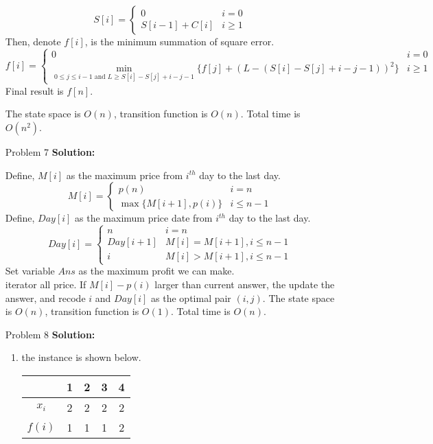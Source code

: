 \normalfont\documentclass[letterpaper,11pt]{article}
\begin{document}
\begin{enumerate}
	$$ S[i]=\left\{
		\begin{array}{ll}
		0   &    i = 0\\
		S[i-1] + C[i] &           i \ge 1
		\end{array} \right. 
	$$
	Then, denote $f[i]$, is the minimum summation of square error.\\
	$$ f[i]=\left\{
		\begin{array}{ll}
		0   &    i = 0\\
		\min \limits_{0 \le j \le i -1\text{ and } L \ge S[i] - S[j] + i - j - 1}\{f[j] + (L - (S[i] - S[j] + i - j - 1))^2\} &           i \ge 1
		\end{array} \right. 
	$$
	Final result is $f[n]$.\par
	The state space is $O(n)$, transition function is $O(n)$. Total time is $O(n^2)$.
\item [Problem 7]\textbf{Solution:}\par
	Define, $M[i]$ as the maximum price from $i^{th}$ day to the last day.
	$$ M[i]=\left\{
		\begin{array}{ll}
		p(n)   &    i = n\\
		\max\{M[i + 1], p(i)\} &           i \le n - 1
		\end{array} \right. 
	$$
	Define, $Day[i]$ as the maximum price date from $i^{th}$ day to the last day.
	$$ Day[i]=\left\{
		\begin{array}{ll}
		n   &    i = n\\
		Day[i + 1]   &    M[i] = M[i+1], i \le n - 1\\
		i & M[i] > M[i+1], i \le n - 1
		\end{array} \right. 
	$$
	Set variable $Ans$ as the maximum profit we can make.\\
	iterator all price. If $M[i] - p(i)$ larger than current answer, the update the answer, and recode $i$ and $Day[i]$ as the optimal pair $(i,j)$.
	The state space is $O(n)$, transition function is $O(1)$. Total time is $O(n)$.
\item [Problem 8]\textbf{Solution:}\par
\begin{enumerate}
	\item the instance is shown below.\par
		\begin{tabular}{|c|c|c|c|c|}
			\hline
			& 1&  2 &  3 &  4   \\
			\hline
			$x_i$ & 2 & 2 & 2 & 2 \\
			\hline
			$f(i)$ & 1 & 1 & 1 & 2 \\

\end{tabular}
\end{enumerate}
\end{enumerate}
\end{document}
